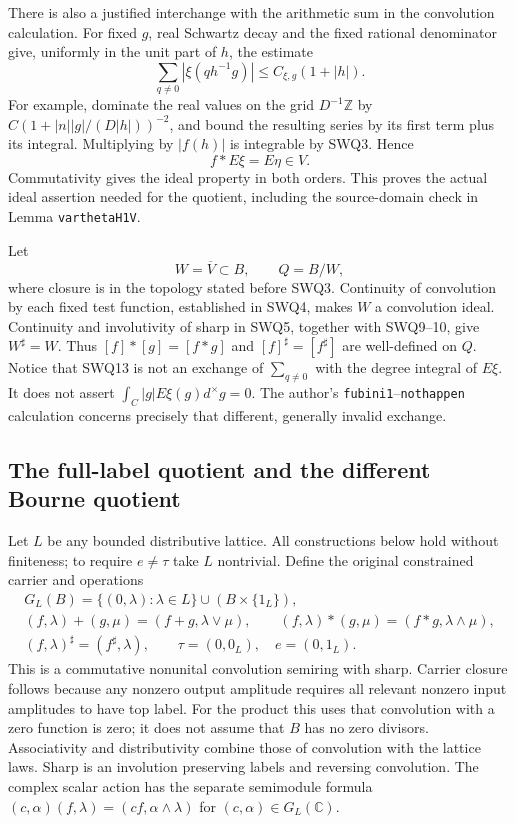 There is also a justified interchange with the arithmetic sum in
the convolution calculation. For fixed $g$, real Schwartz decay and
the fixed rational denominator give, uniformly in the unit part of
$h$, the estimate
\[
 \sum_{q\ne0}|\xi(qh^{-1}g)|\le C_{\xi,g}(1+|h|).
\]
For example, dominate the real values on the grid $D^{-1}\mathbb Z$
by $C(1+|n||g|/(D|h|))^{-2}$, and bound the resulting series by
its first term plus its integral. Multiplying by $|f(h)|$ is
integrable by SWQ3. Hence
\begin{equation}\tag{SWQ14}
 f*E\xi=E\eta\in V.
\end{equation}
Commutativity gives the ideal property in both orders. This proves
the actual ideal assertion needed for the quotient, including the
source-domain check in Lemma \texttt{varthetaH1V}.

Let
\begin{equation}\tag{SWQ15}
 W=\overline V\subset B,\qquad Q=B/W,
\end{equation}
where closure is in the topology stated before SWQ3. Continuity of
convolution by each fixed test function, established in SWQ4,
makes $W$ a convolution ideal. Continuity and involutivity of
sharp in SWQ5, together with SWQ9--10, give $W^{\sharp}=W$.
Thus
$[f]*[g]=[f*g]$ and $[f]^{\sharp}=[f^{\sharp}]$
are well-defined on $Q$. Notice that SWQ13 is not an exchange of
$\sum_{q\ne0}$ with the degree integral of $E\xi$. It does not
assert $\int_C|g|E\xi(g)d^{\times}g=0$. The author's
\texttt{fubini1}--\texttt{nothappen} calculation concerns precisely
that different, generally invalid exchange.

\subsection{The full-label quotient and the different Bourne quotient}

Let $L$ be any bounded distributive lattice. All constructions below
hold without finiteness; to require $e\ne\tau$ take $L$ nontrivial.
Define the original constrained carrier and operations
\begin{equation}\tag{SWQ16}
\begin{gathered}
 G_L(B)=\{(0,\lambda):\lambda\in L\}\cup(B\times\{1_L\}),\\
 (f,\lambda)+(g,\mu)=(f+g,\lambda\vee\mu),\qquad
 (f,\lambda)*(g,\mu)=(f*g,\lambda\wedge\mu),\\
 (f,\lambda)^{\sharp}=(f^{\sharp},\lambda),\qquad
 \tau=(0,0_L),\quad e=(0,1_L).
\end{gathered}
\end{equation}
This is a commutative nonunital convolution semiring with sharp.
Carrier closure follows because any nonzero output amplitude requires
all relevant nonzero input amplitudes to have top label. For the
product this uses that convolution with a zero function is zero;
it does not assume that $B$ has no zero divisors. Associativity and
distributivity combine those of convolution with the lattice laws.
Sharp is an involution preserving labels and reversing convolution.
The complex scalar action has the separate semimodule formula
$(c,\alpha)(f,\lambda)=(cf,\alpha\wedge\lambda)$ for
$(c,\alpha)\in G_L(\mathbb C)$.

